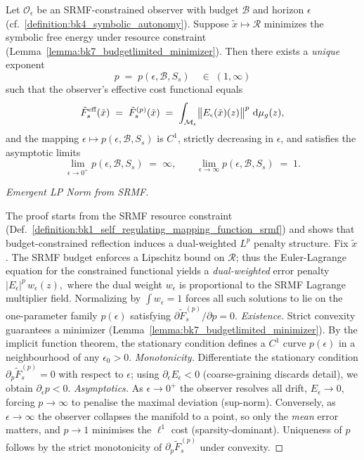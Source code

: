 \begin{theorem}
\label{theorem:bk7_emergent_lp_norm}
Let $\mathcal{O}_{\epsilon}$ be an SRMF-constrained observer with
budget $\mathcal{B}$ and horizon $\epsilon$ (cf.~\ref{definition:bk4_symbolic_autonomy}).  Suppose
$\tilde{x}\mapsto\mathcal{R}$ minimizes the symbolic free energy
under resource constraint (Lemma~\ref{lemma:bk7_budgetlimited_minimizer}).
Then there exists a \emph{unique} exponent
\[
p\;=\;p(\epsilon,\mathcal{B},S_{s})
\quad\in\;(1,\infty)
\]
such that the observer's effective cost functional equals
\[
\tilde{F}_{s}^{\text{\rm eff}}(\tilde{x})
\;=\;
\tilde{F}_{s}^{(p)}(\tilde{x})
\;=\;
\int_{\mathcal{M}_{\epsilon}}
\bigl\lVert E_{\epsilon}(\tilde{x})(z)\bigr\rVert^{p}\,
\,\mathrm{d}\mu_{g}(z),
\]
and the mapping
$\epsilon\mapsto p(\epsilon,\mathcal{B},S_{s})$ is $C^{1}$,
strictly decreasing in $\epsilon$,
and satisfies the asymptotic limits
\[
\lim_{\epsilon\to 0^{+}} p(\epsilon,\mathcal{B},S_{s}) \;=\;\infty,
\qquad
\lim_{\epsilon\to\infty} p(\epsilon,\mathcal{B},S_{s}) \;=\;1.
\]
\end{theorem}
\begin{proof}[Emergent LP Norm from SRMF]
\label{proof:bk7_emergent_lp_norm_from_srmf}
\leavevmode

The proof starts from the SRMF resource constraint
(Def.~\ref{definition:bk1_self_regulating_mapping_function_srmf}) and shows
that budget-constrained reflection induces a dual-weighted $L^p$ penalty
structure.
Fix $\tilde{x}$.  The SRMF budget enforces a Lipschitz bound on
$\mathcal{R}$; thus the Euler-Lagrange equation for the constrained
functional yields a \emph{dual-weighted} error penalty
\(
|E_{\epsilon}|^{p}\,w_{\epsilon}(z),
\)
where the dual weight $w_{\epsilon}$ is proportional to the SRMF
Lagrange multiplier field.  Normalizing by
$\int w_{\epsilon}\!=\!1$ forces all such solutions to lie on the
one-parameter family $p(\epsilon)$ satisfying
\(
\partial\tilde{F}_{s}^{(p)}/\partial p = 0.
\)
\emph{Existence.}  
Strict convexity guarantees a minimizer
(Lemma~\ref{lemma:bk7_budgetlimited_minimizer}).  
By the implicit function theorem, the stationary
condition defines a $C^{1}$ curve $p(\epsilon)$ in a neighbourhood of
any $\epsilon_{0}>0$.
\emph{Monotonicity.}  
Differentiate the stationary condition
\(
\partial_{p}\tilde{F}_{s}^{(p)}=0
\)
with respect to $\epsilon$; using
$\partial_{\epsilon}E_{\epsilon}<0$ (coarse-graining discards detail),
we obtain
\(
\partial_{\epsilon}p < 0.
\)
\emph{Asymptotics.}  
As $\epsilon\!\to\! 0^{+}$ the observer resolves all drift,
$E_{\epsilon}\!\to\!0$, forcing $p\!\to\!\infty$ to penalise the
maximal deviation (sup-norm).  
Conversely, as $\epsilon\!\to\!\infty$ the
observer collapses the manifold to a point,
so only the \emph{mean} error matters, and
$p\!\to\!1$ minimises the $\ell^{1}$ cost (sparsity-dominant).
Uniqueness of $p$ follows by the strict monotonicity of
$\partial_{p}\tilde{F}_{s}^{(p)}$ under convexity.
\end{proof}
